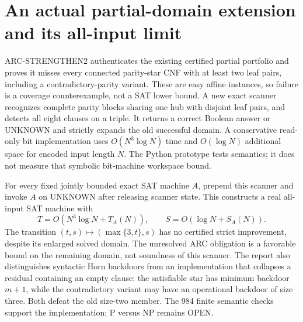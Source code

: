 \section{An actual partial-domain extension and its all-input limit}
ARC-STRENGTHEN2 authenticates the existing certified partial portfolio and
proves it misses every connected parity-star CNF with at least two leaf
pairs, including a contradictory-parity variant. These are easy affine
instances, so failure is a coverage counterexample, not a SAT lower bound.
A new exact scanner recognizes complete parity blocks sharing one hub
with disjoint leaf pairs, and detects all eight clauses on a triple.
It returns a correct Boolean answer or UNKNOWN and strictly expands the
old successful domain. A conservative read-only bit implementation uses
$O(N^3\log N)$ time and $O(\log N)$ additional space for encoded input length $N$.
The Python prototype tests semantics; it does not measure that symbolic
bit-machine workspace bound.

For every fixed jointly bounded exact SAT machine $A$, prepend this
scanner and invoke $A$ on UNKNOWN after releasing scanner state. This
constructs a real all-input SAT machine with
\[
 T=O(N^3\log N+T_A(N)),\qquad S=O(\log N+S_A(N)).
\]
The transition $(t,s)\mapsto(\max\{3,t\},s)$ has no certified strict
improvement, despite its enlarged solved domain. The unresolved ARC
obligation is a favorable bound on the remaining domain, not soundness
of this scanner. The report also distinguishes syntactic Horn backdoors
from an implementation that collapses a residual containing an empty
clause: the satisfiable star has minimum backdoor $m+1$, while the
contradictory variant may have an operational backdoor of size three.
Both defeat the old size-two member. The 984 finite semantic checks
support the implementation; P versus NP remains OPEN.
